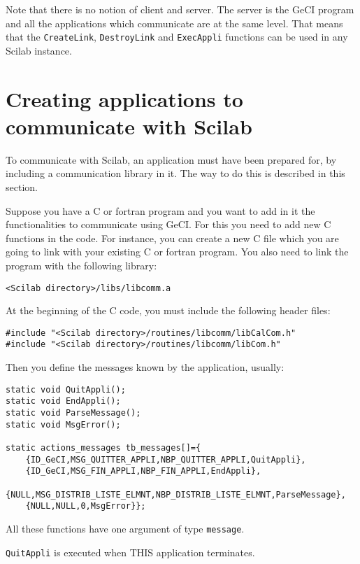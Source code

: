 \documentclass[11pt]{article}
\newcommand{\func}[1]{\texttt{#1}}
\newcommand{\T}[1]{\texttt{#1}}
\begin{document}
Note that there is no notion of client and server. The server is the
GeCI program and all the applications which communicate are at the
same level. That means that the \func{CreateLink}, \func{DestroyLink}
and \func{ExecAppli} functions can be used in any Scilab instance.

\section{Creating applications to communicate with Scilab}\label{internal}

To communicate with Scilab, an application must have been prepared
for, by including a communication library in it. 
The way to do this is described in this section.

Suppose you have a C or fortran program and you want to add in it the
functionalities to communicate using GeCI. For this you need to add
new C functions in the code. For instance, you can create a new C file
which you are going to link with your existing C or fortran
program. You also need to link the program with the following library:

\begin{verbatim}
<Scilab directory>/libs/libcomm.a
\end{verbatim}

At the beginning of the C code, you must include the following header
files:
 
\begin{verbatim}
#include "<Scilab directory>/routines/libcomm/libCalCom.h"
#include "<Scilab directory>/routines/libcomm/libCom.h"
\end{verbatim}

Then you define the messages known by the application, usually:

\begin{verbatim}
static void QuitAppli();
static void EndAppli();
static void ParseMessage();
static void MsgError();

static actions_messages tb_messages[]={
    {ID_GeCI,MSG_QUITTER_APPLI,NBP_QUITTER_APPLI,QuitAppli},
    {ID_GeCI,MSG_FIN_APPLI,NBP_FIN_APPLI,EndAppli},
    {NULL,MSG_DISTRIB_LISTE_ELMNT,NBP_DISTRIB_LISTE_ELMNT,ParseMessage},
    {NULL,NULL,0,MsgError}};
\end{verbatim}

All these functions have one argument of type \T{message}.

\T{QuitAppli} is executed when THIS application terminates.
\end{document}
